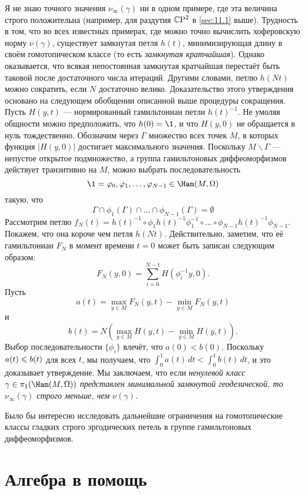 Я не знаю точного значения $\nu_\infty (\gamma)$ ни в одном примере,
где эта величина строго положительна (например, для раздутия $\mathbb{C}\mathrm{P}^2$ в
\ref{sec:11.1} выше).
Трудность в том, что во всех известных примерах, где можно точно
вычислить хоферовскую норму $\nu(\gamma)$, существует замкнутая петля
$h(t)$, минимизирующая длину в своём гомотопическом классе (то есть
\emph{замкнутая кратчайшая}).
Однако оказывается, что всякая непостоянная замкнутая кратчайшая
перестаёт быть таковой после достаточного числа итераций.
Другими словами, петлю $h(Nt)$ можно сократить, если $N$ достаточно велико.
Доказательство этого утверждения основано на следующем обобщении
описанной выше процедуры сокращения.
Пусть $H(y, t)$ --- нормированный гамильтониан петли $h(t)^{-1}$.
Не умоляя общности можно предположить, что $h(0) = \1$, и что $H(y,0)$
не обращается в нуль тождественно.
Обозначим через $\Gamma$ множество всех точек $M$, в которых функция
$|H(y, 0)|$ достигает максимального значения.
Поскольку $M \backslash \Gamma$ --- непустое открытое подмножество, а
группа гамильтоновых диффеоморфизмов действует транзитивно на $M$,
можно выбрать последовательность
\[\1=\phi_0,\phi_1,\dots,\phi_{N-1}\in\Ham(M,\Omega)\]
такую, что 
\[\Gamma\cap\phi_1(\Gamma)\cap\dots\cap\phi_{N-1}(\Gamma)=\emptyset\]
Рассмотрим петлю $f_N(t) = h(t)^{-1} \circ \phi_1h(t)^{-1}\phi_1^{-1}
\circ \dots \circ \phi_{N-1}h(t)^{-1}\phi_{N-1}$.
Покажем, что она короче чем петля $h(Nt)$.
Действительно, заметим, что её гамильтониан $F_N$ в момент времени $t
= 0$ может быть записан следующим образом:
\[F_N(y,0) = \sum_{i=0}^{N-1} H(\phi_i^{-1}y, 0).\]
Пусть
\[a(t)
=
\max_{y\in M} F_N(y, t) - \min_{y\in M}  F_N(y, t)
\]
и
\[b(t)
=
N(\max_{y\in M} H(y, t) - \min_{y\in M}  H(y, t)).
\]
Выбор последовательности $\{\phi_i\}$ влечёт, что $a(0) < b(0)$.
Поскольку $a(t) \z\le b(t)$ для всех $t$, мы получаем, что
$\int_0^1a(t)\,dt < \int_0^1 b(t)\,dt$, и это доказывает утверждение.
Мы заключаем, что если \textit{ненулевой класс $\gamma\in
  \pi_1(\Ham(M, \Omega))$ представлен минимальной замкнутой
  геодезической, то $\nu_\infty (\gamma)$ строго меньше, чем
  $\nu(\gamma)$.}

Было бы интересно исследовать дальнейшие ограничения на гомотопические
классы гладких строго эргодических петель в группе гамильтоновых
диффеоморфизмов. 

\section{Алгебра в помощь}

